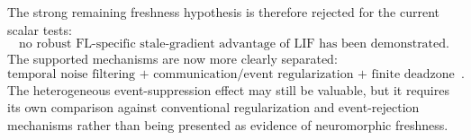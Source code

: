 The strong remaining freshness hypothesis is therefore rejected for the current scalar tests:
\begin{equation}
  \boxed{\text{no robust FL-specific stale-gradient advantage of LIF has been demonstrated.}}
\end{equation}
The supported mechanisms are now more clearly separated:
\begin{equation}
  \boxed{\text{temporal noise filtering + communication/event regularization + finite deadzone behavior}.}
\end{equation}
The heterogeneous event-suppression effect may still be valuable, but it requires its own comparison against conventional regularization and event-rejection mechanisms rather than being presented as evidence of neuromorphic freshness.
